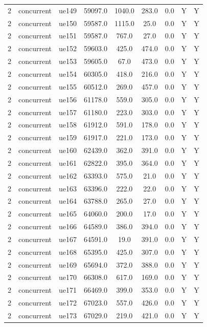 \begin{table}[ht]
\begin{tabular}{|c|c|c|c|c|c|c|c|c|}
2 & concurrent & ue149 & 59097.0 & 1040.0 & 283.0 & 0.0 & Y & Y \\
2 & concurrent & ue150 & 59587.0 & 1115.0 & 25.0 & 0.0 & Y & Y \\
2 & concurrent & ue151 & 59587.0 & 767.0 & 27.0 & 0.0 & Y & Y \\
2 & concurrent & ue152 & 59603.0 & 425.0 & 474.0 & 0.0 & Y & Y \\
2 & concurrent & ue153 & 59605.0 & 67.0 & 473.0 & 0.0 & Y & Y \\
2 & concurrent & ue154 & 60305.0 & 418.0 & 216.0 & 0.0 & Y & Y \\
2 & concurrent & ue155 & 60512.0 & 269.0 & 457.0 & 0.0 & Y & Y \\
2 & concurrent & ue156 & 61178.0 & 559.0 & 305.0 & 0.0 & Y & Y \\
2 & concurrent & ue157 & 61180.0 & 223.0 & 303.0 & 0.0 & Y & Y \\
2 & concurrent & ue158 & 61912.0 & 591.0 & 178.0 & 0.0 & Y & Y \\
2 & concurrent & ue159 & 61917.0 & 221.0 & 173.0 & 0.0 & Y & Y \\
2 & concurrent & ue160 & 62439.0 & 362.0 & 391.0 & 0.0 & Y & Y \\
2 & concurrent & ue161 & 62822.0 & 395.0 & 364.0 & 0.0 & Y & Y \\
2 & concurrent & ue162 & 63393.0 & 575.0 & 21.0 & 0.0 & Y & Y \\
2 & concurrent & ue163 & 63396.0 & 222.0 & 22.0 & 0.0 & Y & Y \\
2 & concurrent & ue164 & 63788.0 & 265.0 & 27.0 & 0.0 & Y & Y \\
2 & concurrent & ue165 & 64060.0 & 200.0 & 17.0 & 0.0 & Y & Y \\
2 & concurrent & ue166 & 64589.0 & 386.0 & 394.0 & 0.0 & Y & Y \\
2 & concurrent & ue167 & 64591.0 & 19.0 & 391.0 & 0.0 & Y & Y \\
2 & concurrent & ue168 & 65395.0 & 425.0 & 307.0 & 0.0 & Y & Y \\
2 & concurrent & ue169 & 65694.0 & 372.0 & 388.0 & 0.0 & Y & Y \\
2 & concurrent & ue170 & 66308.0 & 617.0 & 169.0 & 0.0 & Y & Y \\
2 & concurrent & ue171 & 66469.0 & 399.0 & 353.0 & 0.0 & Y & Y \\
2 & concurrent & ue172 & 67023.0 & 557.0 & 426.0 & 0.0 & Y & Y \\
2 & concurrent & ue173 & 67029.0 & 219.0 & 421.0 & 0.0 & Y & Y \\

\end{tabular}
\end{table}
